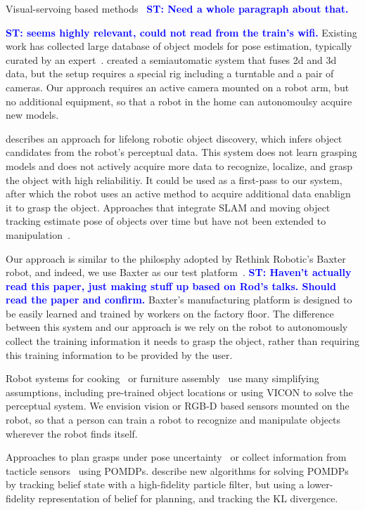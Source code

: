 \documentclass[conference]{IEEEtran}
\newcommand{\stnote}[1]{\textcolor{blue}{\textbf{ST: #1}}}
\begin{document}
Visual-servoing based methods~\citep{chaumette06} \stnote{Need a whole
  paragraph about that. }

\stnote{\citet{ciocarlie14} seems highly relevant, could not read from
  the train's wifi.}  Existing work has collected large database of
object models for pose estimation, typically curated by an
expert~\citep{lai11}.  \citet{kasper12} created a semiautomatic system
that fuses 2d and 3d data, but the setup requires a special rig
including a turntable and a pair of cameras.  Our approach requires an
active camera mounted on a robot arm, but no additional equipment, so
that a robot in the home can autonomoulsy acquire new models.

\citet{collect14} describes an approach for lifelong robotic object
discovery, which infers object candidates from the robot's perceptual
data.  This system does not learn grasping models and does not
actively acquire more data to recognize, localize, and grasp the
object with high reliabilitiy.  It could be used as a first-pass to
our system, after which the robot uses an active method to acquire
additional data enablign it to grasp the object.  Approaches that
integrate SLAM and moving object tracking estimate pose of objects
over time but have not been extended to manipulation~\citep{wang07,
  gallagher09, salas-moreno13, selvatici08}.

Our approach is similar to the philosphy adopted by Rethink Robotic's
Baxter robot, and indeed, we use Baxter as our test
platform~\citep{fitzgerald13}.  \stnote{Haven't actually read this
  paper, just making stuff up based on Rod's talks.  Should read the
  paper and confirm.}  Baxter's manufacturing platform is designed to
be easily learned and trained by workers on the factory floor.  The
difference between this system and our approach is we rely on the
robot to autonomously collect the training information it needs to
grasp the object, rather than requiring this training information to
be provided by the user.


Robot systems for cooking~\citep{bollini12, beetz11} or furniture
assembly~\citep{knepper13} use many simplifying assumptions, including
pre-trained object locations or using VICON to solve the perceptual
system.  We envision vision or RGB-D based sensors mounted on the
robot, so that a person can train a robot to recognize and manipulate
objects wherever the robot finds itself.

Approaches to plan grasps under pose uncertainty~\citep{stulp11} or
collect information from tacticle sensors~\citep{hsiao10} using
POMDPs.  \citet{plat11} describe new algorithms for solving POMDPs by
tracking belief state with a high-fidelity particle filter, but using
a lower-fidelity representation of belief for planning, and tracking
the KL divergence.
\end{document}
